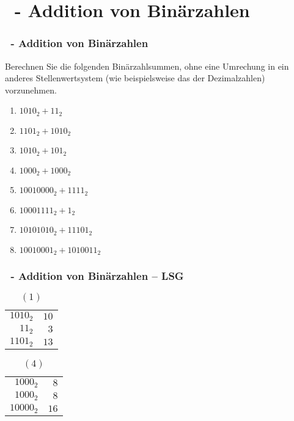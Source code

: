 \def\stitle{\theexercise\ - Addition von Binärzahlen}
\section{\stitle}
\begin{frame}[t]%
  \frametitle{\stitle}
\medskip

Berechnen Sie die folgenden Binärzahlsummen, ohne eine Umrechung in ein anderes Stellenwertsystem (wie beispielsweise das der Dezimalzahlen) vorzunehmen.
\begin{center}
\begin{minipage}{0.45\textwidth}
\begin{enumerate}
\item $1010_2 +   11_2$
\item $1101_2 + 1010_2$
\item $1010_2 +  101_2$
\item $1000_2 + 1000_2$
\end{enumerate}
\end{minipage}
\begin{minipage}{0.45\textwidth}
\begin{enumerate}
\setcounter{enumi}{4}
\item $10010000_2 + 1111_2$
\item $10001111_2 + 1_2$
\item $10101010_2 + 11101_2$
\item $10010001_2 + 1010011_2$
\end{enumerate}
\end{minipage}
\end{center}

\end{frame}


\def\stitle{\theexercise\ - Addition von Binärzahlen -- LSG}
\begin{frame}
  \frametitle{\stitle}
\medskip

\begin{table}
\caption{$(1)$}
\begin{tabular}{r||r}
${1010}_2$ & $10$ \\
${11}_2$   & $3$  \\ \hline
${1101}_2$ & $13$
\end{tabular}
\end{table}

\begin{table}
\caption{$(4)$}
\begin{tabular}{r||r}
${1000}_2$  & $8$ \\
${1000}_2$  & $8$  \\ \hline
${10000}_2$ & $16$
\end{tabular}
\end{table}
\end{frame}
